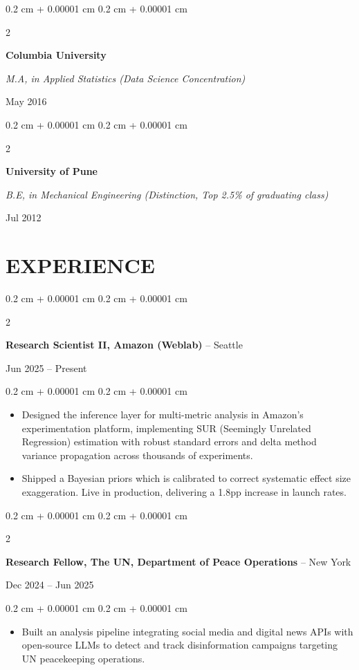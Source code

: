 \documentclass[10pt, letterpaper]{article}
\newenvironment{highlights}{
    \begin{itemize}[
        topsep=0.10 cm,
        parsep=0.10 cm,
        partopsep=0pt,
        itemsep=0pt,
        leftmargin=0.4 cm + 10pt
    ]
}{
    \end{itemize}
} %
\newenvironment{onecolentry}{
    \begin{adjustwidth}{
        0.2 cm + 0.00001 cm
    }{
        0.2 cm + 0.00001 cm
    }
}{
    \end{adjustwidth}
} %
\newenvironment{twocolentry}[2][]{
    \onecolentry
    \def\secondColumn{#2}
    \setcolumnwidth{\fill, 4.5 cm}
    \begin{paracol}{2}
}{
    \switchcolumn \raggedleft \secondColumn
    \end{paracol}
    \endonecolentry
} %
\begin{document}
        \begin{twocolentry}{May 2016}
            \textbf{Columbia University}

            \textit{M.A, in Applied Statistics (Data Science Concentration)}
        \end{twocolentry}

        \begin{twocolentry}{Jul 2012}
            \textbf{University of Pune}

            \textit{B.E, in Mechanical Engineering (Distinction, Top 2.5\% of graduating class)}
        \end{twocolentry}

    \section{EXPERIENCE}
        \begin{twocolentry}{Jun 2025 -- Present}
            \textbf{Research Scientist II, Amazon (Weblab)} -- Seattle
        \end{twocolentry}
        \begin{onecolentry}
            \begin{highlights}
            \vspace{0.05 cm}
                \item Designed the inference layer for multi-metric analysis in Amazon's experimentation platform, implementing SUR (Seemingly Unrelated Regression) estimation with robust standard errors and delta method variance propagation across thousands of experiments.
                \item Shipped a Bayesian priors which is calibrated to correct systematic effect size exaggeration. Live in production, delivering a 1.8pp increase in launch rates.
            \end{highlights}
        \end{onecolentry}

        \begin{twocolentry}{Dec 2024 -- Jun 2025}
            \textbf{Research Fellow, The UN, Department of Peace Operations} -- New York
        \end{twocolentry}
        \begin{onecolentry}
            \begin{highlights}
            \vspace{0.05 cm}
                \item Built an analysis pipeline integrating social media and digital news APIs with open-source LLMs to detect and track disinformation campaigns targeting UN peacekeeping operations.
            \end{highlights}
        \end{onecolentry}
\end{document}
